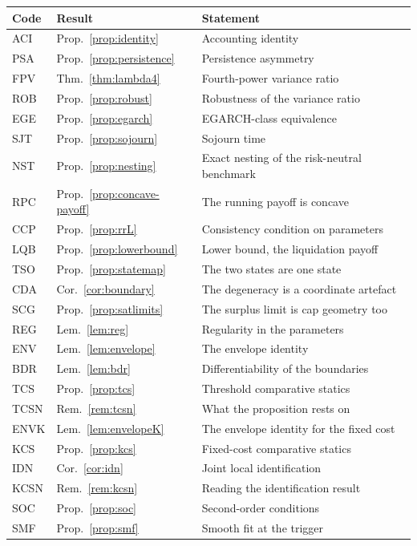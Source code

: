 \documentclass[11pt]{article}
\theoremstyle{remark}
\begin{document}
\begin{longtable}{lll}
\toprule
Code & Result & Statement \\
\midrule
\endhead
ACI & Prop.~\ref{prop:identity} & Accounting identity \\
PSA & Prop.~\ref{prop:persistence} & Persistence asymmetry \\
FPV & Thm.~\ref{thm:lambda4} & Fourth-power variance ratio \\
ROB & Prop.~\ref{prop:robust} & Robustness of the variance ratio \\
EGE & Prop.~\ref{prop:egarch} & EGARCH-class equivalence \\
SJT & Prop.~\ref{prop:sojourn} & Sojourn time \\
NST & Prop.~\ref{prop:nesting} & Exact nesting of the risk-neutral benchmark \\
RPC & Prop.~\ref{prop:concave-payoff} & The running payoff is concave \\
CCP & Prop.~\ref{prop:rrL} & Consistency condition on parameters \\
LQB & Prop.~\ref{prop:lowerbound} & Lower bound, the liquidation payoff \\
TSO & Prop.~\ref{prop:statemap} & The two states are one state \\
CDA & Cor.~\ref{cor:boundary} & The degeneracy is a coordinate artefact \\
SCG & Prop.~\ref{prop:satlimits} & The surplus limit is cap geometry too \\
REG & Lem.~\ref{lem:reg} & Regularity in the parameters \\
ENV & Lem.~\ref{lem:envelope} & The envelope identity \\
BDR & Lem.~\ref{lem:bdr} & Differentiability of the boundaries \\
TCS & Prop.~\ref{prop:tcs} & Threshold comparative statics \\
TCSN & Rem.~\ref{rem:tcsn} & What the proposition rests on \\
ENVK & Lem.~\ref{lem:envelopeK} & The envelope identity for the fixed cost \\
KCS & Prop.~\ref{prop:kcs} & Fixed-cost comparative statics \\
IDN & Cor.~\ref{cor:idn} & Joint local identification \\
KCSN & Rem.~\ref{rem:kcsn} & Reading the identification result \\
SOC & Prop.~\ref{prop:soc} & Second-order conditions \\
SMF & Prop.~\ref{prop:smf} & Smooth fit at the trigger \\

\end{longtable}
\end{document}
